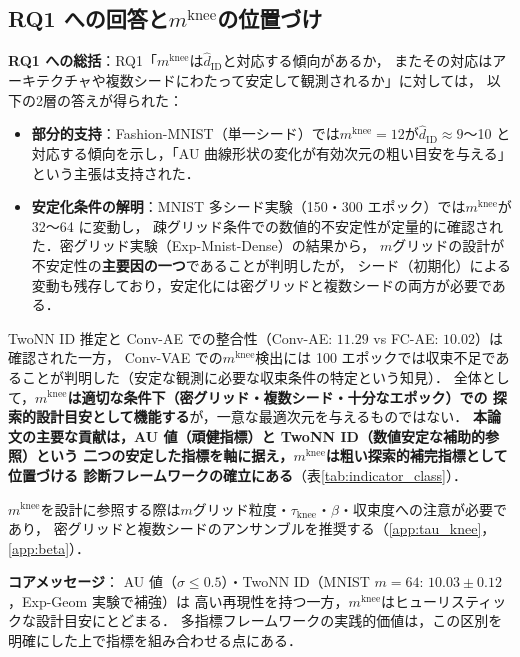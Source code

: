 \documentclass[11pt,a4paper]{jsarticle}
\newcommand{\mknee}{m^{\mathrm{knee}}}
\begin{document}
\subsection{RQ1 への回答と$\mknee$の位置づけ}\label{sec:disc_mknee}

\textbf{RQ1 への総括}：RQ1「$\mknee$は$\hat{d}_\mathrm{ID}$と対応する傾向があるか，
またその対応はアーキテクチャや複数シードにわたって安定して観測されるか」に対しては，
以下の2層の答えが得られた：

\begin{itemize}
  \item \textbf{部分的支持}：Fashion-MNIST（単一シード）では$\mknee = 12$が$\hat{d}_\mathrm{ID} \approx 9$〜10
        と対応する傾向を示し，「AU 曲線形状の変化が有効次元の粗い目安を与える」という主張は支持された．
  \item \textbf{安定化条件の解明}：MNIST 多シード実験（150・300 エポック）では$\mknee$が 32〜64 に変動し，
        疎グリッド条件での数値的不安定性が定量的に確認された．密グリッド実験（Exp-Mnist-Dense）の結果から，
        $m$グリッドの設計が不安定性の\textbf{主要因の一つ}であることが判明したが，
        シード（初期化）による変動も残存しており，安定化には密グリッドと複数シードの両方が必要である．
\end{itemize}

TwoNN ID 推定と Conv-AE での整合性（Conv-AE: $11.29$ vs FC-AE: $10.02$）は確認された一方，
Conv-VAE での$\mknee$検出には 100 エポックでは収束不足であることが判明した（安定な観測に必要な収束条件の特定という知見）．
全体として，\textbf{$\mknee$は適切な条件下（密グリッド・複数シード・十分なエポック）での
探索的設計目安として機能する}が，一意な最適次元を与えるものではない．
\textbf{本論文の主要な貢献は，AU 値（頑健指標）と TwoNN ID（数値安定な補助的参照）という
二つの安定した指標を軸に据え，$\mknee$は粗い探索的補完指標として位置づける
診断フレームワークの確立にある}（表\ref{tab:indicator_class}）．

$\mknee$を設計に参照する際は$m$グリッド粒度・$\tau_\mathrm{knee}$・$\beta$・収束度への注意が必要であり，
密グリッドと複数シードのアンサンブルを推奨する（\ref{app:tau_knee}，\ref{app:beta}）．

\textbf{コアメッセージ}：
AU 値（$\sigma \leq 0.5$）・TwoNN ID（MNIST $m=64$: $10.03 \pm 0.12$，Exp-Geom 実験で補強）は
高い再現性を持つ一方，$\mknee$はヒューリスティックな設計目安にとどまる．
多指標フレームワークの実践的価値は，この区別を明確にした上で指標を組み合わせる点にある．

\end{document}
